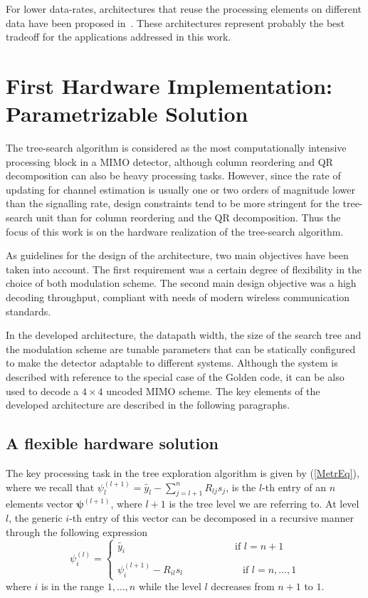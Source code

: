 \documentclass[12pt,onecolumn,draftclsnofoot]{IEEEtran}
\begin{document}
For lower data-rates, architectures that reuse the processing elements
on different data have been proposed in~\cite{Alternat1, Alternat2}.
These architectures represent probably the best
tradeoff for the applications addressed in this work.

\section{First Hardware Implementation: \\
Parametrizable Solution}

\label{HW1}

The tree-search algorithm is considered as the most computationally intensive 
processing block in a MIMO detector, although 
column reordering and QR decomposition can also be heavy processing tasks.
However,  since the rate of updating for channel estimation is usually one
or two orders of magnitude lower than the signalling rate, design constraints
tend to be more stringent for the tree-search unit than for
column reordering and the QR decomposition.
Thus the focus of this work is on the hardware realization of
the tree-search algorithm.

As guidelines for the design of the architecture, two main
objectives have been taken into account. The first requirement was a
certain degree of flexibility in the choice of both modulation
scheme. The second main design
objective was a high decoding throughput, compliant with 
needs of modern wireless communication standards.


In the developed architecture, the datapath width, the size
of the search tree and the modulation scheme are tunable
parameters that can be statically configured to make the detector
adaptable to different systems. Although the system is
described with reference to the special case of the Golden code, it
can be also used to decode a $4\times 4$ uncoded MIMO scheme.
The key elements of the developed architecture
are described in the following paragraphs.
\subsection{A flexible hardware solution}


The key processing task in the tree exploration algorithm is given by
(\ref{MetrEq}), where we recall that
$\psi_l^{(l+1)}= \tilde{y_l} - \sum_{j=l+1}^{n} R_{lj}s_{j}$,
is the $l$-th entry of an $n$ elements vector 
$\boldsymbol{\psi}^{(l+1)}$, where $l+1$ is the tree level we are referring to. 
At level $l$, the generic $i$-th entry of this vector can be decomposed in a 
recursive manner 
through the following expression
\begin{equation}
\label{psiEq}
\psi_i^{(l)} = \left \{ \begin{array}{l}
\tilde{y_i} \qquad \qquad \qquad \qquad \qquad \quad \textrm{if $l = n+1$}\\
\\
\psi_i^{(l+1)} - R_{il} s_{l} \qquad \qquad \qquad  \textrm{if $l = n, \dots , 1$} 
\end{array} \right.
\end{equation}
\noindent where $i$ is in the range $1, \ldots, n$ while the level $l$ decreases from $n+1$ to $1$. 
\end{document}
